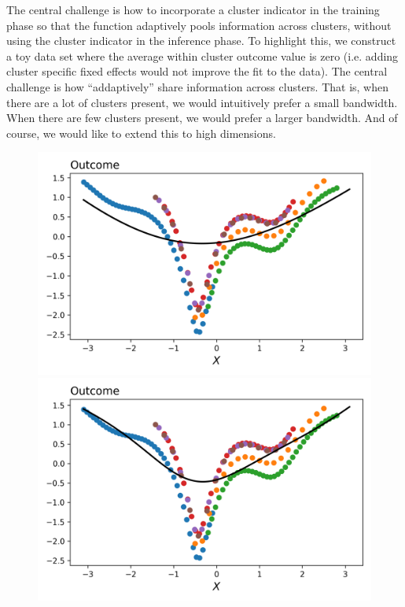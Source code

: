 \documentclass[a4paper,12pt]{article}
\begin{document}
The central challenge is how to incorporate a cluster indicator in the training phase so that the function adaptively pools information across clusters, without using the cluster indicator in the inference phase. To highlight this, we construct a toy data set where the average within cluster outcome value is zero (i.e. adding cluster specific fixed effects would not improve the fit to the data). The central challenge is how ``addaptively'' share information across clusters. That is, when there are a lot of clusters present, we would intuitively prefer a small bandwidth. When there are few clusters present, we would prefer a larger bandwidth. And of course, we would like to extend this to high dimensions.

\begin{figure}[htbp]
\centering
\includegraphics[scale=0.3]{figures/framework/local_linear_no_const_0.5_18_LM.png}
\includegraphics[scale=0.3]{figures/framework/local_linear_no_const_1.0_18_LM.png}

\end{figure}
\end{document}
